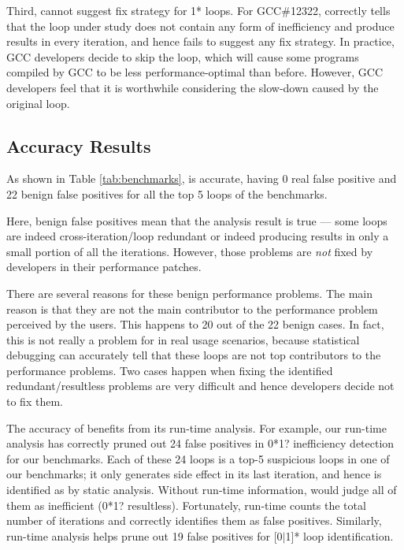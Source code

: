 Third, \Tool cannot suggest fix strategy for 1* loops.
For GCC\#12322, \Tool correctly tells that the loop under study
does not contain any form of inefficiency and produce results in every 
iteration, and hence fails to suggest any fix strategy. In practice, GCC
developers decide to skip the loop, which will cause some programs compiled by
GCC
to be less performance-optimal than before. However, GCC developers feel
that it is worthwhile considering the slow-down caused by the original loop.

\subsection{Accuracy Results}
\label{sec:result_acc}

%

As shown in Table \ref{tab:benchmarks}, \Tool is accurate, having 0 real
false positive and 22 benign false positives for all the top 5 loops
of the \allbugs benchmarks.

Here, benign false positives mean that the \Tool analysis result is true ---
some loops are indeed cross-iteration/loop redundant or indeed producing
results in only a small portion of all the iterations. However, those
problems are \textit{not} fixed by developers in their performance patches. 

There are several reasons for these benign performance problems. 
The main reason is that they are not the main contributor to the 
performance problem perceived by the users. This happens to 20 out of the
22 benign cases. %
In fact, this is not really a problem for \Tool in 
real usage scenarios, because statistical debugging can accurately
tell that these loops are not top contributors to the performance
problems.
Two cases happen when fixing the 
identified redundant/resultless problems
are very difficult and hence developers decide not to fix them.

The accuracy of \Tool benefits from its run-time analysis.
For example, our run-time analysis has correctly pruned out 24 false positives
in 0*1? inefficiency detection for our benchmarks. Each of these 24 loops is a
top-5 suspicious loops in one of our benchmarks; it only generates side effect
in its last iteration, and hence is identified as by \Tool static analysis. 
Without run-time information, \Tool would judge
all of them as inefficient (0*1? resultless). Fortunately,
\Tool run-time counts the total number of iterations and
correctly identifies them as false positives. Similarly, \Tool run-time analysis
helps prune out 19 false positives for [0$|$1]* loop identification.


